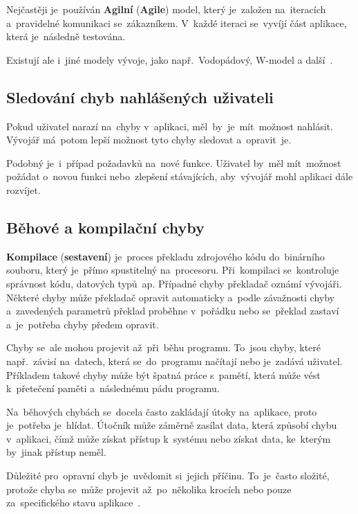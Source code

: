 \documentclass[11pt,a4paper]{report}
\begin{document}
                Nejčastěji je~používán \textbf{Agilní} (\textbf{Agile}) model, který je~založen na~iteracích a~pravidelné komunikaci se~zákazníkem. V~každé iteraci se~vyvíjí část aplikace, která je~následně testována.
                
                Existují ale i~jiné modely vývoje, jako např.~Vodopádový, W-model a další~\cite{sdlc:kadlec2004agilni}.

            \subsection{Sledování chyb nahlášených uživateli}
                Pokud uživatel narazí na~chyby v~aplikaci, měl~by~je~mít~možnost nahlásit. Vývojář má~potom lepší možnost tyto chyby sledovat a~opravit~je.

                Podobný je~i~případ požadavků na~nové funkce. Uživatel by~měl mít~možnost požádat o~novou funkci nebo~zlepšení stávajících,
                aby~vývojář mohl aplikaci dále rozvíjet.

            \subsection{Běhové a kompilační chyby}
                \textbf{Kompilace} (\textbf{sestavení}) je~proces překladu zdrojového kódu do~binárního souboru, který je~přímo spustitelný na~procesoru. Při~kompilaci se~kontroluje správnost kódu, datových typů~ap. Případné chyby překladač oznámí vývojáři. Některé chyby může překladač opravit automaticky a~podle závažnosti chyby a~zavedených parametrů překlad proběhne v~pořádku nebo se~překlad zastaví a~je~potřeba chyby předem opravit.

                Chyby se~ale mohou projevit až~při~běhu programu. To~jsou chyby, které např.~závisí na~datech, která se~do~programu načítají nebo je~zadává uživatel. Příkladem takové chyby může být špatná práce s~pamětí, která může vést k~přetečení paměti a~následnému pádu programu.

                Na~běhových chybách se~docela často zakládají útoky na~aplikace, proto je~potřeba je~hlídat. Útočník může záměrně zasílat data, která způsobí chybu v~aplikaci, čímž může získat přístup k~systému nebo získat data, ke~kterým by~jinak přístup neměl.

                Důležité pro~opravní chyb je~uvědomit si~jejich příčinu. To~je~často složité, protože chyba se~může projevit až~po~několika krocích nebo pouze za~specifického stavu aplikace~\cite{graham2021ethical}.
\end{document}

